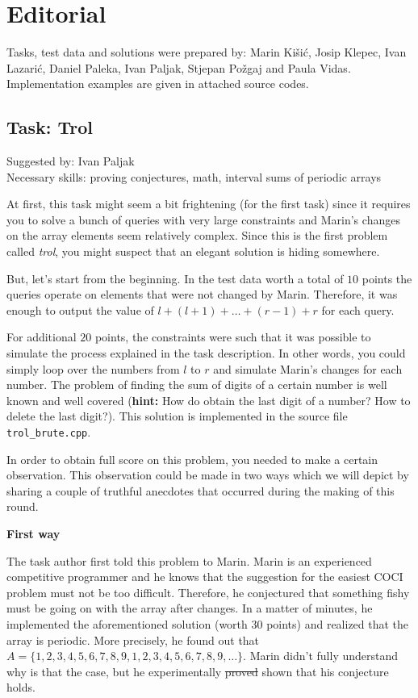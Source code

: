 \documentclass[a4paper]{article}
\begin{document}
\section*{Editorial}
Tasks, test data and solutions were prepared by: Marin Kišić,
Josip Klepec, Ivan Lazarić, Daniel Paleka, Ivan Paljak, Stjepan Požgaj and
Paula Vidas. Implementation examples are given in attached source codes.

\subsection*{Task: Trol}
\textsf{Suggested by: Ivan Paljak}\\
\textsf{Necessary skills: proving conjectures, math, interval sums of periodic
arrays}

At first, this task might seem a bit frightening (for the first task) since
it requires you to solve a bunch of queries with very large constraints and
Marin's changes on the array elements seem relatively complex. Since this is
the first problem called \textit{trol}, you might suspect that an elegant
solution is hiding somewhere.

But, let's start from the beginning. In the test data worth a total of $10$
points the queries operate on elements that were not changed by Marin. Therefore,
it was enough to output the value of $l + (l + 1) + … + (r - 1) + r$ for
each query.

For additional $20$ points, the constraints were such that it was possible
to simulate the process explained in the task description. In other words,
you could simply loop over the numbers from $l$ to $r$ and simulate Marin's
changes for each number. The problem of finding the sum of digits of a certain
number is well known and well covered (\textbf{hint:} How do obtain the last
digit of a number? How to delete the last digit?). This solution is implemented
in the source file \texttt{trol\_brute.cpp}.

In order to obtain full score on this problem, you needed to make a certain
observation. This observation could be made in two ways which we will depict
by sharing a couple of truthful anecdotes that occurred during the making of
this round.

\textbf{First way}

The task author first told this problem to Marin. Marin is an experienced
competitive programmer and he knows that the suggestion for the easiest COCI
problem must not be too difficult. Therefore, he conjectured that something
fishy must be going on with the array after changes. In a matter of minutes,
he implemented the aforementioned solution (worth 30 points) and realized that
the array is periodic. More precisely, he found out that
$A = \{1, 2, 3, 4, 5, 6, 7, 8, 9, 1, 2, 3, 4, 5, 6, 7, 8, 9, \dots\}$. Marin
didn't fully understand why is that the case, but he experimentally
\sout{proved} shown that his conjecture holds.
\end{document}
